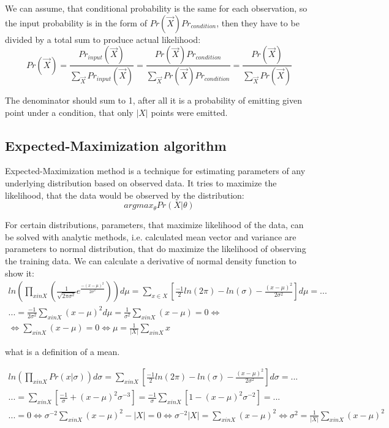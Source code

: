\documentclass[12pt,a4paper,english]{article}
\begin{document}
We can assume, that conditional probability is the same for each observation,
 so the input probability is in the form of $ Pr(\vec X) Pr_{condition}$,
then they have to be divided by a total sum to produce actual likelihood:
\begin{equation}
    Pr(\vec X) = \frac{Pr_{input}(\vec X)}{\sum_{\vec X} Pr_{input}(\vec X)} = \frac{Pr(\vec X) Pr_{condition}}{\sum_{\vec X} Pr(\vec X) Pr_{condition}} = 
\frac{Pr(\vec X)}{\sum_{\vec X} Pr(\vec X)}
\end{equation}

The denominator should sum to 1, after all it is a probability of emitting given point under a condition, that only $|X|$ points were emitted.

\newpage
\subsection{Expected-Maximization algorithm}

Expected-Maximization method is a technique for estimating parameters of any underlying distribution based on observed data. It tries to maximize the likelihood, that the data would be observed by the distribution: 
\begin{equation}
    argmax_{\theta} Pr(X | \theta)
\end{equation}

For certain distributions, parameters, that maximize likelihood of the data, can be solved with analytic methods, i.e. calculated mean vector and variance are parameters to normal distribution, that do maximize the likelihood of observing the training data. \newline
We can calculate a derivative of normal density function to show it:
\begin{multline}
    ln(\prod_{x in X} (\frac 1 {\sqrt{2\pi\sigma^2}} e^{\frac{-(x-\mu)^2}{2\sigma^2}}))d\mu  = \sum_{x \in X}[\frac{-1} 2 ln(2\pi)-ln(\sigma)- \frac{(x-\mu)^2} {2 \sigma^2} ]d\mu = ... \\
    ...= \frac {-1} {2 \sigma^2} \sum_{x in X}{(x-\mu)^2}d\mu = \frac 1 {\sigma^2} \sum_{x in X}{(x-\mu)}=0 \iff \\
    \iff \sum_{x in X}{(x-\mu)}=0 \iff \mu = \frac 1 {|X|} \sum_{x in X}x
\end{multline}

what is a definition of a mean. \newline 

\begin{multline}
    ln(\prod_{x in X} Pr(x | \sigma))d\sigma = \sum_{x in X}[\frac {-1} 2 ln(2\pi)-ln(\sigma)- \frac {(x-\mu)^2} {2 \sigma^2} ]d\sigma = ... \\
    ...= \sum_{x in X}[\frac {-1} \sigma + (x-\mu)^2 \sigma^{-3}] = \frac {-1} {\sigma} \sum_{x in X}[1-(x-\mu)^2 \sigma^{-2}]=... \\
    ...= 0 \iff \sigma^{-2} \sum_{x in X}(x-\mu)^2 - | X |=0 \iff \sigma^{-2} | X | = \sum_{x in X}(x-\mu)^2 \iff \sigma^2 = \frac 1 {|X|} \sum_{x in X}(x-\mu)^2
\end{multline}
\end{document}
